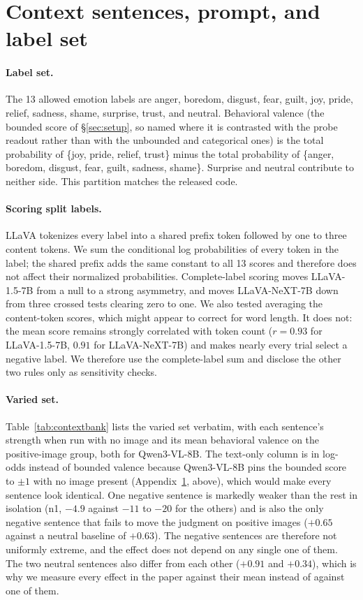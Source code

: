 \documentclass{article}
\newcommand{\qwen}{Qwen3-VL-8B}
\newcommand{\llava}{LLaVA-1.5-7B}
\newcommand{\llavanext}{LLaVA-NeXT-7B}
\begin{document}
\section{Context sentences, prompt, and label set}
\label{app:contexts}

\paragraph{Label set.}
The 13 allowed emotion labels are anger, boredom, disgust, fear, guilt, joy, pride, relief, sadness, shame, surprise, trust, and neutral. Behavioral valence (the bounded score of \S\ref{sec:setup}, so named where it is contrasted with the probe readout rather than with the unbounded and categorical ones) is the total probability of \{joy, pride, relief, trust\} minus the total probability of \{anger, boredom, disgust, fear, guilt, sadness, shame\}. Surprise and neutral contribute to neither side. This partition matches the released code.

\paragraph{Scoring split labels.}
LLaVA tokenizes every label into a shared prefix token followed by one to three content tokens. We sum the conditional log probabilities of every token in the label; the shared prefix adds the same constant to all 13 scores and therefore does not affect their normalized probabilities. Complete-label scoring moves \llava{} from a null to a strong asymmetry, and moves \llavanext{} down from three crossed tests clearing zero to one. We also tested averaging the content-token scores, which might appear to correct for word length. It does not: the mean score remains strongly correlated with token count ($r=0.93$ for \llava{}, $0.91$ for \llavanext{}) and makes nearly every trial select a negative label. We therefore use the complete-label sum and disclose the other two rules only as sensitivity checks.

\paragraph{Varied set.}
Table~\ref{tab:contextbank} lists the varied set verbatim, with each sentence's strength when run with no image and its mean behavioral valence on the positive-image group, both for \qwen{}. The text-only column is in log-odds instead of bounded valence because \qwen{} pins the bounded score to $\pm 1$ with no image present (Appendix~\ref{app:contexts}, above), which would make every sentence look identical. One negative sentence is markedly weaker than the rest in isolation (n1, $-4.9$ against $-11$ to $-20$ for the others) and is also the only negative sentence that fails to move the judgment on positive images ($+0.65$ against a neutral baseline of $+0.63$). The negative sentences are therefore not uniformly extreme, and the effect does not depend on any single one of them. The two neutral sentences also differ from each other ($+0.91$ and $+0.34$), which is why we measure every effect in the paper against their mean instead of against one of them.
\end{document}
